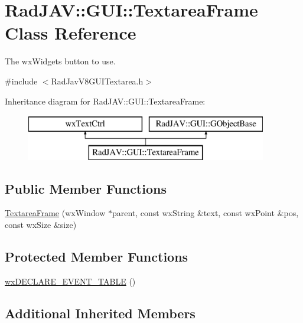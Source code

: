 \hypertarget{class_rad_j_a_v_1_1_g_u_i_1_1_textarea_frame}{}\section{Rad\+J\+AV\+:\+:G\+UI\+:\+:Textarea\+Frame Class Reference}
\label{class_rad_j_a_v_1_1_g_u_i_1_1_textarea_frame}


The wx\+Widgets button to use.  




{\ttfamily \#include $<$Rad\+Jav\+V8\+G\+U\+I\+Textarea.\+h$>$}

Inheritance diagram for Rad\+J\+AV\+:\+:G\+UI\+:\+:Textarea\+Frame\+:\begin{figure}[H]
\begin{center}
\leavevmode
\includegraphics[height=2.000000cm]{class_rad_j_a_v_1_1_g_u_i_1_1_textarea_frame}
\end{center}
\end{figure}
\subsection*{Public Member Functions}
\begin{DoxyCompactItemize}
\item 
\mbox{\hyperlink{class_rad_j_a_v_1_1_g_u_i_1_1_textarea_frame_a3b5c785d7e1709156e3c608dba2340f0}{Textarea\+Frame}} (wx\+Window $\ast$parent, const wx\+String \&text, const wx\+Point \&pos, const wx\+Size \&size)
\end{DoxyCompactItemize}
\subsection*{Protected Member Functions}
\begin{DoxyCompactItemize}
\item 
\mbox{\hyperlink{class_rad_j_a_v_1_1_g_u_i_1_1_textarea_frame_a089042fc0cddcf794d9f7c752fa3c2ca}{wx\+D\+E\+C\+L\+A\+R\+E\+\_\+\+E\+V\+E\+N\+T\+\_\+\+T\+A\+B\+LE}} ()
\end{DoxyCompactItemize}
\subsection*{Additional Inherited Members}


